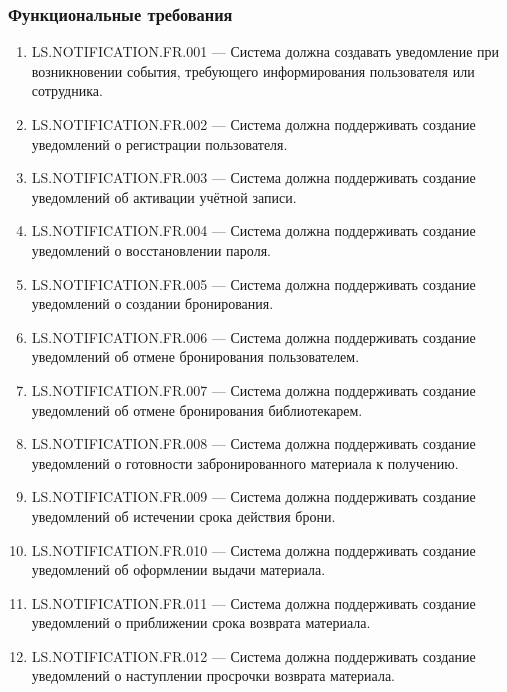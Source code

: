 \documentclass[12pt,a4paper]{article}
\begin{document}
	\subsubsection{Функциональные требования}
	
	\begin{enumerate}
		\item LS.NOTIFICATION.FR.001 --- Система должна создавать уведомление при
		возникновении события, требующего информирования пользователя или сотрудника.
		
		\item LS.NOTIFICATION.FR.002 --- Система должна поддерживать создание уведомлений
		о регистрации пользователя.
		
		\item LS.NOTIFICATION.FR.003 --- Система должна поддерживать создание уведомлений
		об активации учётной записи.
		
		\item LS.NOTIFICATION.FR.004 --- Система должна поддерживать создание уведомлений
		о восстановлении пароля.
		
		\item LS.NOTIFICATION.FR.005 --- Система должна поддерживать создание уведомлений
		о создании бронирования.
		
		\item LS.NOTIFICATION.FR.006 --- Система должна поддерживать создание уведомлений
		об отмене бронирования пользователем.
		
		\item LS.NOTIFICATION.FR.007 --- Система должна поддерживать создание уведомлений
		об отмене бронирования библиотекарем.
		
		\item LS.NOTIFICATION.FR.008 --- Система должна поддерживать создание уведомлений
		о готовности забронированного материала к получению.
		
		\item LS.NOTIFICATION.FR.009 --- Система должна поддерживать создание уведомлений
		об истечении срока действия брони.
		
		\item LS.NOTIFICATION.FR.010 --- Система должна поддерживать создание уведомлений
		об оформлении выдачи материала.
		
		\item LS.NOTIFICATION.FR.011 --- Система должна поддерживать создание уведомлений
		о приближении срока возврата материала.
		
		\item LS.NOTIFICATION.FR.012 --- Система должна поддерживать создание уведомлений
		о наступлении просрочки возврата материала.
		

\end{enumerate}
\end{document}
